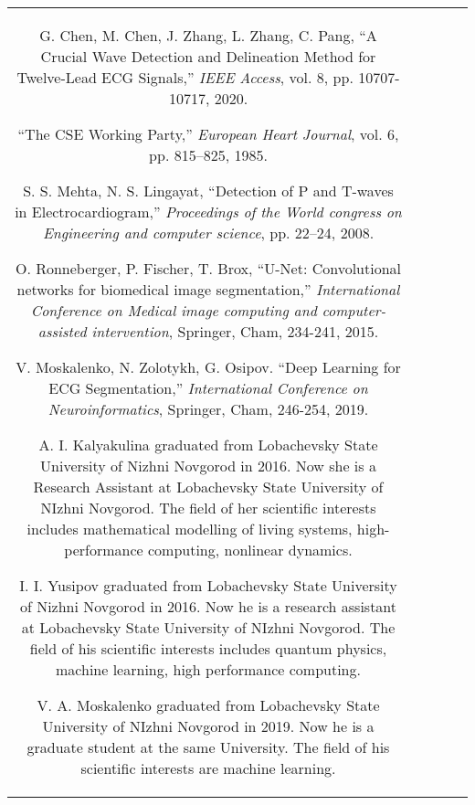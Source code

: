 \documentclass[submitted]{ieeeaccess}
\newcommand{\NewCorrection}[1]{{#1}}
\begin{document}
\begin{table}
\begin{tabular}{|c|c|c|c|c|}
\begin{thebibliography}{99}
    \bibitem{Chen2020}
    G. Chen, M. Chen, J. Zhang, L. Zhang, C. Pang, 
    ``A Crucial Wave Detection and Delineation Method for Twelve-Lead ECG Signals,'' \emph{IEEE Access}, vol. 8, pp. 10707-10717, 2020.

	

	\bibitem{standart1985}
	``{T}he CSE Working Party,''
	\newblock \emph{European Heart Journal}, vol. 6, pp. 815--825, 1985.
	
	\bibitem{Mehta2008}
	S. S. Mehta, N. S. Lingayat, 
	``{D}etection of P and T-waves in Electrocardiogram,''
	\newblock \emph{Proceedings of the World congress on Engineering and computer science}, pp. 22--24, 2008.
	
	\bibitem{Ronneberger2015}
	\NewCorrection{O. Ronneberger, P. Fischer, T. Brox,  ``U-Net: Convolutional networks for biomedical image segmentation,'' \emph{International Conference on Medical image computing
	and computer-assisted intervention}, Springer, Cham, 234-241, 2015.}
	
	\bibitem{Moskalenko2019}
	\NewCorrection{V. Moskalenko, N. Zolotykh, G. Osipov. ``Deep Learning for ECG Segmentation,'' \emph{International Conference on Neuroinformatics}, Springer, Cham, 246-254, 2019.}	
	
    
	
\end{thebibliography}


\begin{IEEEbiography}[{\texttt{[image: Kalyakulina.jpg]}}]{A. I. Kalyakulina} graduated from Lobachevsky State University of Nizhni Novgorod in 2016. Now she is a Research Assistant at Lobachevsky State University of NIzhni Novgorod. The field of her scientific interests includes mathematical modelling of living systems, high-performance computing, nonlinear dynamics.      
\end{IEEEbiography}

\begin{IEEEbiography}[{\texttt{[image: Yusipov.jpg]}}]{I. I. Yusipov} graduated from Lobachevsky State University of Nizhni Novgorod in 2016. Now he is a research assistant at Lobachevsky State University of NIzhni Novgorod. The field of his scientific interests includes quantum physics, machine learning, high performance computing.  
\end{IEEEbiography}

\begin{IEEEbiography}[{\texttt{[image: Moskalenko.jpg]}}]{V. A. Moskalenko} graduated from Lobachevsky State University of NIzhni Novgorod in 2019. Now he is a graduate student at the same University. The field of his scientific interests are machine learning.  
\end{IEEEbiography}







\end{tabular}
\end{table}
\end{document}
